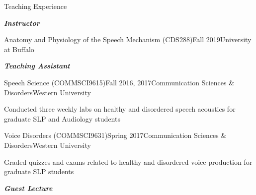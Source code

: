 \documentclass{resume} %
\begin{document}



\begin{rSection}{Teaching Experience}

\begin{center}
	{\bf \emph{Instructor}}
\end{center}

	\begin{rSubsection}{Anatomy and Physiology of the Speech Mechanism (CDS288)}{Fall 2019}{University at Buffalo}{}
	\end{rSubsection}

\begin{center}
	{\bf \emph{Teaching Assistant}}
\end{center}
	
	\begin{rSubsection}{Speech Science (COMMSCI9615)}{Fall 2016, 2017}{Communication Sciences \& Disorders}{Western University}
	\item Conducted three weekly labs on healthy and disordered speech acoustics for graduate SLP and Audiology students
	\end{rSubsection}

	\begin{rSubsection}{Voice Disorders (COMMSCI9631)}{Spring 2017}{Communication Sciences \& Disorders}{Western University}
	\item Graded quizzes and exams related to healthy and disordered voice production for graduate SLP students
	\end{rSubsection}
	
	
\begin{center}
	{\bf \emph{Guest Lecture}}
\end{center}


\end{rSection}
\end{document}
